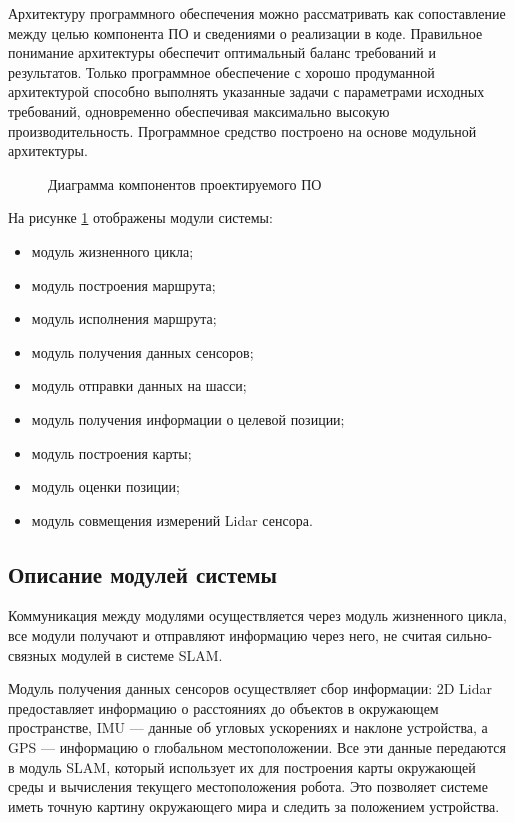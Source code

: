 Архитектуру  программного  обеспечения  можно рассматривать  как  сопоставление
между целью компонента ПО и сведениями о реализации в коде. Правильное понимание
архитектуры  обеспечит  оптимальный баланс требований и результатов. Только
программное обеспечение с хорошо продуманной архитектурой способно выполнять
указанные задачи с параметрами исходных требований, одновременно обеспечивая
максимально высокую производительность. Программное средство построено на основе
модульной архитектуры. 

\FloatBarrier
\begin{figure}[H]
\label{fig:components}
\centering
\caption{Диаграмма компонентов проектируемого ПО}
\end{figure}

На рисунке \ref{fig:components} отображены модули системы:~
\begin{itemize}
	\item модуль жизненного цикла;
	\item модуль построения маршрута;
	\item модуль исполнения маршрута;
	\item модуль получения данных сенсоров;
	\item модуль отправки данных на шасси;
	\item модуль получения информации о целевой позиции;
	\item модуль построения карты;
	\item модуль оценки позиции;
	\item модуль совмещения измерений Lidar сенсора.
\end{itemize}

\subsection{Описание модулей системы}

Коммуникация между модулями осуществляется через модуль жизненного цикла, все
модули получают и отправляют информацию через него, не считая сильно-связных
модулей в системе SLAM. 

Модуль получения данных сенсоров осуществляет сбор информации: 2D Lidar
предоставляет информацию о расстояниях до объектов в окружающем пространстве,
IMU — данные об угловых ускорениях и наклоне устройства, а GPS — информацию о
глобальном местоположении. Все эти данные передаются в модуль SLAM, который
использует их для построения карты окружающей среды и вычисления текущего
местоположения робота. Это позволяет системе иметь точную картину окружающего
мира и следить за положением устройства.

